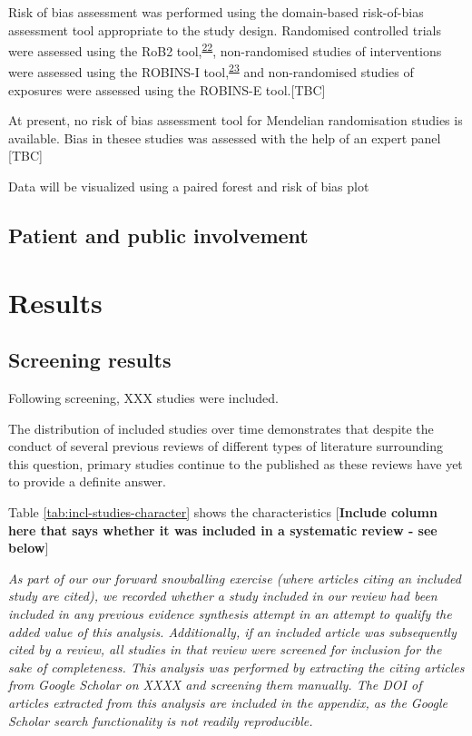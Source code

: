 \documentclass[a4paper, twoside]{templates/ociamthesis}
\begin{document}
Risk of bias assessment was performed using the domain-based risk-of-bias assessment tool appropriate to the study design. Randomised controlled trials were assessed using the RoB2 tool,\textsuperscript{\protect\hyperlink{ref-sterne2019}{22}}, non-randomised studies of interventions were assessed using the ROBINS-I tool,\textsuperscript{\protect\hyperlink{ref-sterne2016}{23}} and non-randomised studies of exposures were assessed using the ROBINS-E tool.{[}TBC{]}

At present, no risk of bias assessment tool for Mendelian randomisation studies is available. Bias in thesee studies was assessed with the help of an expert panel {[}TBC{]}

Data will be visualized using a paired forest and risk of bias plot

\hypertarget{patient-and-public-involvement}{%
\subsection{Patient and public involvement}\label{patient-and-public-involvement}}

\hypertarget{results}{%
\section{Results}\label{results}}

\hypertarget{screening-results}{%
\subsection{Screening results}\label{screening-results}}

Following screening, XXX studies were included.

The distribution of included studies over time demonstrates that despite the conduct of several previous reviews of different types of literature surrounding this question, primary studies continue to the published as these reviews have yet to provide a definite answer.

Table \ref{tab:incl-studies-character} shows the characteristics {[}\textbf{Include column here that says whether it was included in a systematic review - see below}{]}

\emph{As part of our our forward snowballing exercise (where articles citing an included study are cited), we recorded whether a study included in our review had been included in any previous evidence synthesis attempt in an attempt to qualify the added value of this analysis. Additionally, if an included article was subsequently cited by a review, all studies in that review were screened for inclusion for the sake of completeness. This analysis was performed by extracting the citing articles from Google Scholar on XXXX and screening them manually. The DOI of articles extracted from this analysis are included in the appendix, as the Google Scholar search functionality is not readily reproducible.}
\end{document}
